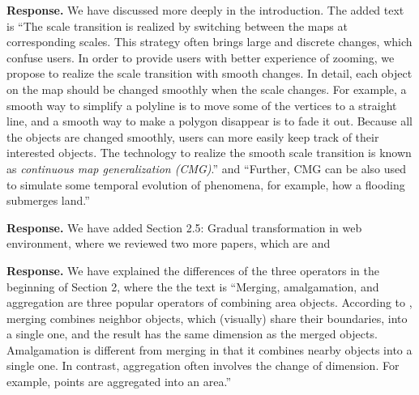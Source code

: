 \documentclass[a4paper,twoside,11pt]{reviewresponse}
\begin{document}
\textbf{Response.}
We have discussed more deeply in the introduction.
The added text is
``The scale transition is realized by switching 
between the maps at corresponding scales. 
This strategy often brings large and discrete changes, 
which confuse users.
In order to provide users with better experience of zooming,
we propose to realize the scale transition with smooth changes.
In detail, each object on the map should be changed smoothly
when the scale changes.
For example, a smooth way to simplify a polyline is 
to move some of the vertices to a straight line,
and a smooth way to make a polygon disappear is to fade it out.
Because all the objects are changed smoothly,
users can more easily keep track of their interested objects.
The technology to realize the smooth scale transition is known as
\emph{continuous map generalization (CMG)}.''
and
``Further, CMG can be also used 
to simulate some temporal evolution of phenomena,
for example, how a flooding submerges land.''

\textbf{Response.}
We have added Section 2.5:
Gradual transformation in web environment,
where we reviewed two more papers, which are
\citet{Huang2016Webmap} and \citet{Peng2020Viewer}

\textbf{Response.}
We have explained the differences of the three operators
in the beginning of Section 2,
where the the text is
``Merging, amalgamation, and aggregation  
are three popular operators of combining area objects. 
According to \citet{Shea1989Digital},
merging combines neighbor objects, 
which (visually) share their boundaries, into a single one,
and the result has the same dimension as the merged objects.
Amalgamation is different from merging in that 
it combines nearby objects into a single one.
In contrast, aggregation often involves the change of dimension.
For example, points are aggregated into an area.''
\end{document}
